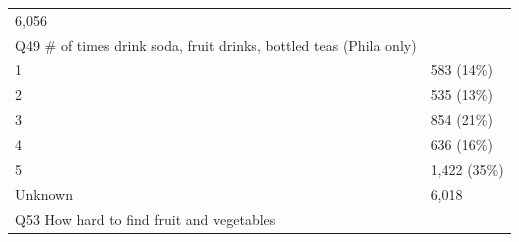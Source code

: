 \documentclass[]{article}
\begin{document}
\begin{longtable}[]{@{}ll@{}}
\begin{minipage}[t]{0.23\columnwidth}
6,056\strut
\end{minipage}\tabularnewline
\begin{minipage}[t]{0.71\columnwidth}\raggedright
Q49 \# of times drink soda, fruit drinks, bottled teas (Phila
only)\strut
\end{minipage} & \begin{minipage}[t]{0.23\columnwidth}\raggedright
\strut
\end{minipage}\tabularnewline
\begin{minipage}[t]{0.71\columnwidth}\raggedright
1\strut
\end{minipage} & \begin{minipage}[t]{0.23\columnwidth}\raggedright
583 (14\%)\strut
\end{minipage}\tabularnewline
\begin{minipage}[t]{0.71\columnwidth}\raggedright
2\strut
\end{minipage} & \begin{minipage}[t]{0.23\columnwidth}\raggedright
535 (13\%)\strut
\end{minipage}\tabularnewline
\begin{minipage}[t]{0.71\columnwidth}\raggedright
3\strut
\end{minipage} & \begin{minipage}[t]{0.23\columnwidth}\raggedright
854 (21\%)\strut
\end{minipage}\tabularnewline
\begin{minipage}[t]{0.71\columnwidth}\raggedright
4\strut
\end{minipage} & \begin{minipage}[t]{0.23\columnwidth}\raggedright
636 (16\%)\strut
\end{minipage}\tabularnewline
\begin{minipage}[t]{0.71\columnwidth}\raggedright
5\strut
\end{minipage} & \begin{minipage}[t]{0.23\columnwidth}\raggedright
1,422 (35\%)\strut
\end{minipage}\tabularnewline
\begin{minipage}[t]{0.71\columnwidth}\raggedright
Unknown\strut
\end{minipage} & \begin{minipage}[t]{0.23\columnwidth}\raggedright
6,018\strut
\end{minipage}\tabularnewline
\begin{minipage}[t]{0.71\columnwidth}\raggedright
Q53 How hard to find fruit and vegetables\strut

\end{minipage}
\end{longtable}
\end{document}
